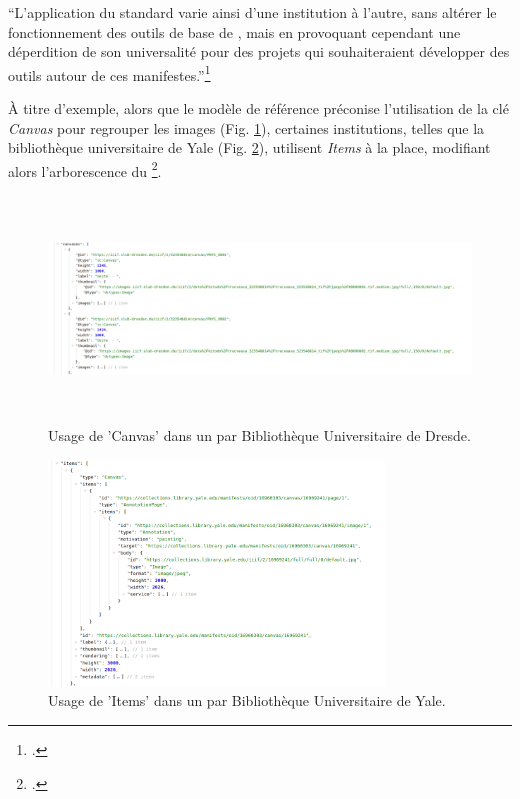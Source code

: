 \begin{kwote}
``L'application du standard varie ainsi d'une institution à l'autre, sans
altérer le fonctionnement des outils de base de \iiif, mais en provoquant
cependant une déperdition de son universalité pour des projets qui
souhaiteraient développer des outils autour de ces
manifestes.''\footcite[p.25]{norindr_traitement_2023}
\end{kwote}   

À titre d'exemple, alors que le modèle de référence préconise
l'utilisation de la clé \textit{Canvas} pour regrouper les images
(Fig. \ref{fig:dresde}), certaines institutions, telles que la
bibliothèque universitaire de Yale (Fig. \ref{fig:yale}),
utilisent \textit{Items} à la place, modifiant alors l'arborescence du \man\footcite[p.25]{norindr_traitement_2023}.

          \begin{figure}[H]
          \begin{center}
          \includegraphics[height=6cm]{figues/dresde_manifest.png}
          \end{center}
          \caption{Usage de 'Canvas' dans un \man \iiif par Bibliothèque Universitaire de Dresde.}
          \label{fig:dresde} \end{figure}

          \begin{figure}[H]
          \begin{center}
          \includegraphics[height=6cm]{figues/yale_manifest.png}
          \end{center}
          \caption{Usage de 'Items' dans un \man \iiif par Bibliothèque Universitaire de Yale.}
          \label{fig:yale} \end{figure}

